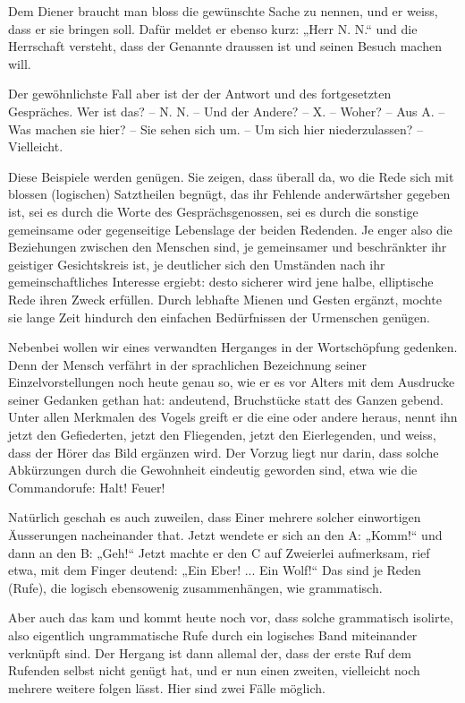 Dem Diener braucht man bloss die gewünschte Sache zu nennen, und er weiss, dass er sie bringen soll. Dafür meldet er ebenso kurz: „Herr N. N.“ und die Herrschaft versteht, dass der Genannte draussen ist und seinen Besuch machen will.

Der gewöhnlichste Fall aber ist der der Antwort und des fortgesetzten Gespräches. Wer ist das? – N. N. – Und der Andere? – X. – Woher? – Aus A. – Was machen sie hier? – Sie sehen sich um. – Um sich hier niederzulassen? – Vielleicht.

\largerpage[1]Diese Beispiele werden genügen. Sie zeigen, dass überall da, wo die Rede sich mit blossen (logischen) Satztheilen begnügt, das ihr Fehlende anderwärtsher gegeben ist, sei es durch die Worte des Gesprächsgenossen, sei es durch die sonstige gemeinsame oder gegenseitige Lebenslage der beiden Redenden. Je enger also die Beziehungen zwischen den Menschen sind, je gemeinsamer und \label{sp.367} beschränkter ihr geistiger Gesichtskreis ist, je deutlicher sich den Umständen nach ihr gemeinschaftliches Interesse ergiebt: desto sicherer wird jene halbe, elliptische Rede ihren Zweck erfüllen. Durch lebhafte Mienen und Gesten ergänzt, mochte sie lange Zeit hindurch den einfachen Bedürfnissen der Urmenschen genügen.

Nebenbei wollen wir eines verwandten Herganges in der Wortschöpfung gedenken. Denn der Mensch verfährt in der sprachlichen Bezeichnung seiner Einzelvorstellungen noch heute genau so, wie er es vor Alters mit dem Ausdrucke seiner Gedanken gethan hat: andeutend, Bruchstücke statt des Ganzen gebend. Unter allen Merkmalen des Vogels greift er die eine oder andere heraus, nennt ihn jetzt den Gefiederten, jetzt den Fliegenden, jetzt den Eierlegenden, und weiss, dass der Hörer das Bild ergänzen wird. Der Vorzug liegt nur darin, dass solche Abkürzungen durch die Gewohnheit eindeutig geworden sind, etwa wie die Commandorufe: Halt! Feuer!

Natürlich geschah es auch zuweilen, dass Einer mehrere solcher einwortigen Äusserungen nacheinander that. Jetzt wendete er sich an den A: „Komm!“ und dann an den B: „Geh!“ Jetzt machte er den C auf Zweierlei aufmerksam, rief etwa, mit dem Finger deutend: „Ein Eber! ... Ein Wolf!“ Das sind je  Reden (Rufe), die logisch ebensowenig zusammenhängen, wie grammatisch.

\label{fp.351}

Aber auch das kam und kommt heute noch vor, dass solche grammatisch isolirte, also eigentlich ungrammatische Rufe durch ein logisches Band miteinander verknüpft sind. Der Hergang ist dann allemal der, dass der erste Ruf dem Rufenden selbst nicht genügt hat, und er nun einen zweiten, vielleicht noch mehrere weitere folgen lässt. Hier sind zwei Fälle möglich.

